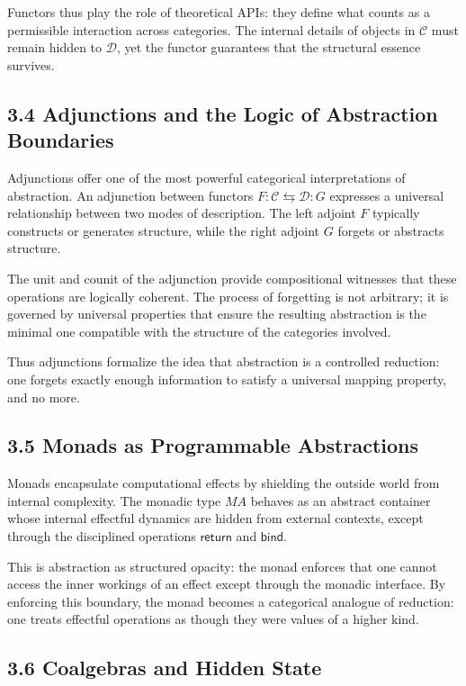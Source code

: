 \documentclass[11pt,letterpaper]{article}
\begin{document}
Functors thus play the role of theoretical APIs: they define what counts as a permissible interaction across categories. The internal details of objects in \(\mathcal{C}\) must remain hidden to \(\mathcal{D}\), yet the functor guarantees that the structural essence survives.

\subsection{3.4 Adjunctions and the Logic of Abstraction Boundaries}

Adjunctions offer one of the most powerful categorical interpretations of abstraction. An adjunction between functors \(F : \mathcal{C} \leftrightarrows \mathcal{D} : G\) expresses a universal relationship between two modes of description. The left adjoint \(F\) typically constructs or generates structure, while the right adjoint \(G\) forgets or abstracts structure.

The unit and counit of the adjunction provide compositional witnesses that these operations are logically coherent. The process of forgetting is not arbitrary; it is governed by universal properties that ensure the resulting abstraction is the minimal one compatible with the structure of the categories involved.

Thus adjunctions formalize the idea that abstraction is a controlled reduction: one forgets exactly enough information to satisfy a universal mapping property, and no more.

\subsection{3.5 Monads as Programmable Abstractions}

Monads encapsulate computational effects by shielding the outside world from internal complexity. The monadic type \(M A\) behaves as an abstract container whose internal effectful dynamics are hidden from external contexts, except through the disciplined operations \(\mathsf{return}\) and \(\mathsf{bind}\).

This is abstraction as structured opacity: the monad enforces that one cannot access the inner workings of an effect except through the monadic interface. By enforcing this boundary, the monad becomes a categorical analogue of reduction: one treats effectful operations as though they were values of a higher kind.

\subsection{3.6 Coalgebras and Hidden State}
\end{document}
